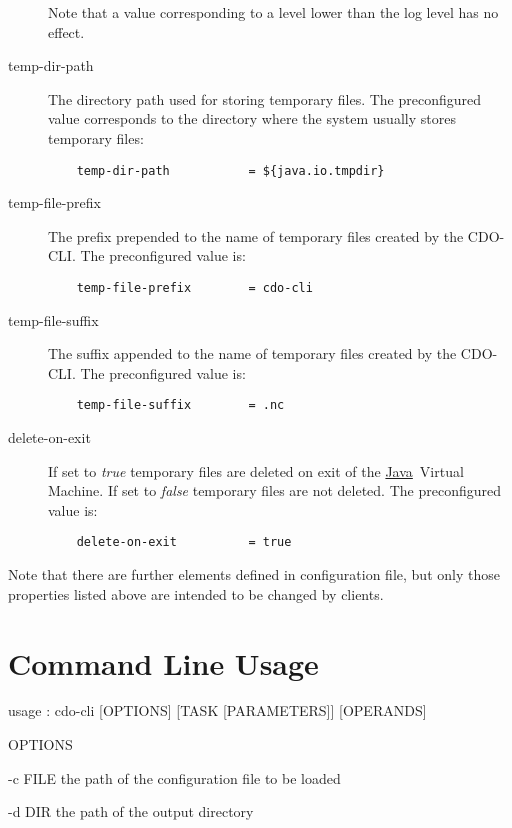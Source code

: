 \documentclass[
square
,pdftex
]{refrep}
\newcommand{\java}{\href{http://java.sun.com/}{Java}}
\begin{document}
\begin{description}
Note that a value corresponding to a level lower than the log level has no
effect.

\item[temp-dir-path]
The directory path used for storing temporary files. The preconfigured value
corresponds to the directory where the system usually stores temporary files:
\begin{verbatim}
    temp-dir-path           = ${java.io.tmpdir}
\end{verbatim}

\item[temp-file-prefix]
The prefix prepended to the name of temporary files created by the CDO-CLI. The
preconfigured value is:
\begin{verbatim}
    temp-file-prefix        = cdo-cli
\end{verbatim}

\item[temp-file-suffix]
The suffix appended to the name of temporary files created by the CDO-CLI. The
preconfigured value is:
\begin{verbatim}
    temp-file-suffix        = .nc
\end{verbatim}

\item[delete-on-exit]
If set to \emph{true} temporary files are deleted on exit of the \java\
Virtual Machine. If set to \emph{false} temporary files are not deleted.
The preconfigured value is:
\begin{verbatim}
    delete-on-exit          = true
\end{verbatim}

\end{description}

\attention
Note that there are further elements defined in configuration file, but only
those properties listed above are intended to be changed by clients.

\chapter{Command Line Usage}
\label{cli}

usage : cdo-cli [OPTIONS] [TASK [PARAMETERS]] [OPERANDS]


OPTIONS

    -c FILE
        the path of the configuration file to be loaded

    -d DIR
        the path of the output directory
\end{document}
